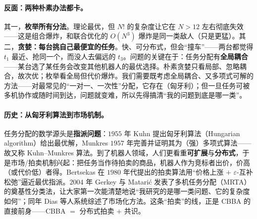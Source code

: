 \paragraph{反面：两种朴素办法都卡。}
其一，\textbf{枚举所有分法}。理论最优，但 $N!$ 的复杂度让它在 $N>12$ 左右彻底失效——这是组合爆炸，和联合优化的 $O(N^3)$ 爆炸是同一类敌人（只是更猛）。其二，\textbf{贪婪：每台挑自己最便宜的任务}。快、可分布式，但会“撞车”——两台都觉得 $t_1$ 最近、抢同一个，而没人去偏远的 $t_3$。问题的关键在于：任务分配有\textbf{全局耦合}——某台选了某任务会改变其他机器人的最优选择。朴素贪婪只看局部、忽略耦合，故次优；枚举看全局但代价爆炸。我们需要既考虑全局耦合、又多项式可解的方法——对最常见的“一对一、一次性”分配，它存在（匈牙利）；但一旦任务可被多机协作或随时间到达，问题就变难，所以先得搞清“我的问题到底是哪一类”。

\paragraph{历史：从匈牙利算法到市场机制。}
任务分配的数学源头是\textbf{指派问题}：$1955$ 年 Kuhn 提出匈牙利算法（Hungarian algorithm）给出最优解\cite{kuhn1955hungarian}，Munkres $1957$ 年完善并证明其为（强）多项式算法\cite{munkres1957algorithms}——故又称 Kuhn--Munkres 算法。到了机器人领域，人们更看重\textbf{可扩展}与\textbf{分布式}，于是市场/拍卖机制兴起：把任务当作待拍卖的商品，机器人作为竞标者出价，价高（或代价低）者得。Bertsekas 在 $1980$ 年代提出的拍卖算法用“价格上涨 $+$ $\varepsilon$-互补松弛”逼近最优指派\cite{bertsekas1988auction}。$2004$ 年 Gerkey 与 Matari\'c 发表了多机任务分配（MRTA）的奠基性分类法\cite{gerkey2004taxonomy}，让大家第一次能清楚地说“我研究的是哪一类问题、它的复杂度如何”；同年 Dias 等人系统综述了市场化方法\cite{dias2006market}。这条“拍卖”的线，正是 CBBA 的直接前身——CBBA $=$ 分布式拍卖 $+$ 共识。

